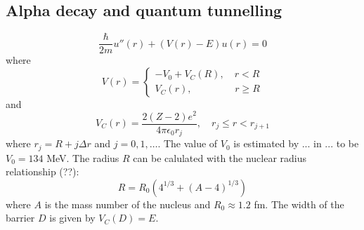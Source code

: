 \documentclass[twocolumn]{article}
\begin{document}
\begin{large}
\section*{Alpha decay and quantum tunnelling}
\blindtext
\begin{equation}
    \frac{\hbar}{2m}u''(r) + (V(r)-E)u(r) = 0
\end{equation}
where 
\begin{equation}
    V(r) = 
    \begin{cases}
        -V_0 + V_C(R), \quad r < R \\
        V_C(r), \qquad\qquad\,\, r\geq R
    \end{cases}
\end{equation}
and 
\begin{equation}
    V_C(r) = \frac{2(Z-2)e^2}{4\pi\epsilon_0r_j},\quad r_j\leq r < r_{j+1}
\end{equation}
where $r_j = R+j\Delta r$ and $j=0,1,\dots$. The value of $V_0$ is estimated by ... in ... to be $V_0 = 134$ MeV. The radius $R$ can be calulated with the nuclear radius relationship (??):
\begin{equation}
    R = R_0\left(4^{1/3} + (A-4)^{1/3}\right)
\end{equation}
where $A$ is the mass number of the nucleus and $R_0\approx 1.2$ fm. The width of the barrier $D$ is given by $V_C(D) = E$. 

\end{large}
\end{document}
